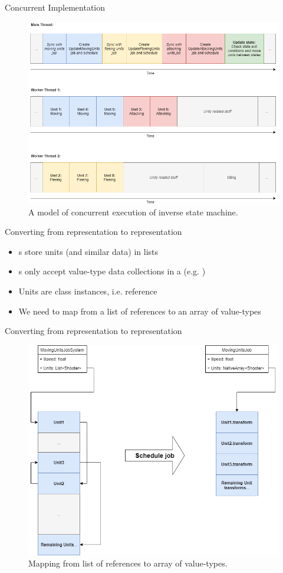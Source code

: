 \begin{frame}{\secname}{\subsecname}
	Concurrent Implementation
	\begin{figure}[h!]
        \centering
        \includegraphics[width=.7\textwidth]{pictures/concurrent.png}
        \caption{A model of concurrent execution of inverse state machine.}
    \end{figure}
\end{frame}

\begin{frame}[fragile]{\secname}{\subsecname}
	Converting from  representation to  representation
	\begin{itemize}
		\item {}s store units (and similar data) in lists
		\item {}s only accept value-type data collections in a  (e.g. )
		\item Units are class instances, i.e. reference
		\item We need to map from a list of references to an array of value-types
	\end{itemize}
\end{frame}

\begin{frame}{\secname}{\subsecname}
	Converting from  representation to  representation
	\begin{figure}[h!]
        \centering
        \includegraphics[width=.7\textwidth]{pictures/concurrent-memory-layout.png}
        \caption{Mapping from list of references to array of value-types.}
    \end{figure}
\end{frame}

